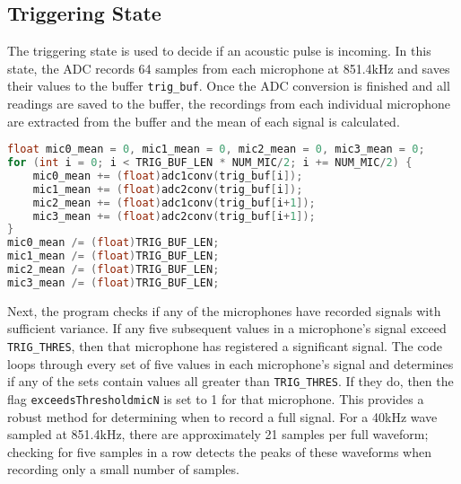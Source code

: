 \documentclass[11pt]{ucthesisCP}
\begin{document}
\subsection{Triggering State} \label{ssec:3s7s3}
The triggering state is used to decide if an acoustic pulse is incoming. In this state, the ADC records 64 samples from each microphone at 851.4kHz and saves their values to the buffer \verb|trig_buf|. Once the ADC conversion is finished and all readings are saved to the buffer, the recordings from each individual microphone are extracted from the buffer and the mean of each signal is calculated.

\begin{lstlisting}[language=C++]
float mic0_mean = 0, mic1_mean = 0, mic2_mean = 0, mic3_mean = 0;
for (int i = 0; i < TRIG_BUF_LEN * NUM_MIC/2; i += NUM_MIC/2) {
	mic0_mean += (float)adc1conv(trig_buf[i]);
	mic1_mean += (float)adc2conv(trig_buf[i]);
	mic2_mean += (float)adc1conv(trig_buf[i+1]);
	mic3_mean += (float)adc2conv(trig_buf[i+1]);
}
mic0_mean /= (float)TRIG_BUF_LEN;
mic1_mean /= (float)TRIG_BUF_LEN;
mic2_mean /= (float)TRIG_BUF_LEN;
mic3_mean /= (float)TRIG_BUF_LEN;
\end{lstlisting}

Next, the program checks if any of the microphones have recorded signals with sufficient variance. If any five subsequent values in a microphone’s signal exceed \verb|TRIG_THRES|, then that microphone has registered a significant signal. The code loops through every set of five values in each microphone’s signal and determines if any of the sets contain values all greater than \verb|TRIG_THRES|. If they do, then the flag \verb|exceedsThresholdmicN| is set to 1 for that microphone. This provides a robust method for determining when to record a full signal. For a 40kHz wave sampled at 851.4kHz, there are approximately 21 samples per full waveform; checking for five samples in a row detects the peaks of these waveforms when recording only a small number of samples.
\end{document}
